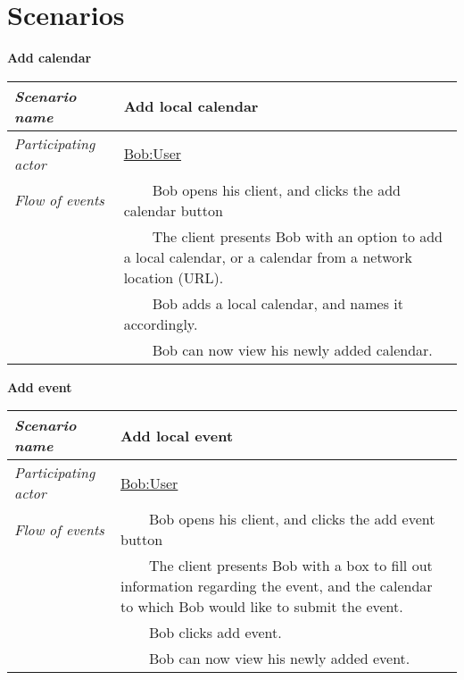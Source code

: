 \documentclass[10pt]{report}
\newcommand{\tabitem}{~~\llap{\textbullet}~~}
\numberwithin{equation}{section} %
\numberwithin{figure}{section} %
\numberwithin{table}{section} %
\begin{document}
\section{Scenarios}
\begin{table}[H]
\noindent \textbf{Add calendar}\\
\begin{tabularx}{\textwidth}{l X}
\midrule
\textit{Scenario name} & Add local calendar \\ \midrule
\textit{Participating actor} & \underline{Bob:User} \\ \midrule
\textit{Flow of events} & \tabitem Bob opens his client, and clicks the add
                                       calendar button \\
                                       & \tabitem The client presents Bob with
                                       an option to add a local calendar, or a
                                       calendar from a network location (URL). \\
                                       & \tabitem Bob adds a local calendar, and
                                       names it accordingly. \\
                                       & \tabitem Bob can now view his newly
                                       added calendar. \\
                                       \midrule
\end{tabularx}
\end{table}

\begin{table}[H]
\noindent \textbf{Add event}\\
\begin{tabularx}{\textwidth}{l X}
\midrule
\textit{Scenario name} & Add local event \\ \midrule
\textit{Participating actor} & \underline{Bob:User} \\ \midrule
\textit{Flow of events} & \tabitem Bob opens his client, and clicks the add
                                       event button \\
                                       & \tabitem The client presents Bob with
                                       a box to fill out information regarding
                                       the event, and the calendar to which Bob
                                       would like to submit the event.  \\
                                       & \tabitem Bob clicks add event.  \\
                                       & \tabitem Bob can now view his newly
                                       added event. \\
                                       \midrule
\end{tabularx}
\end{table}
\end{document}
